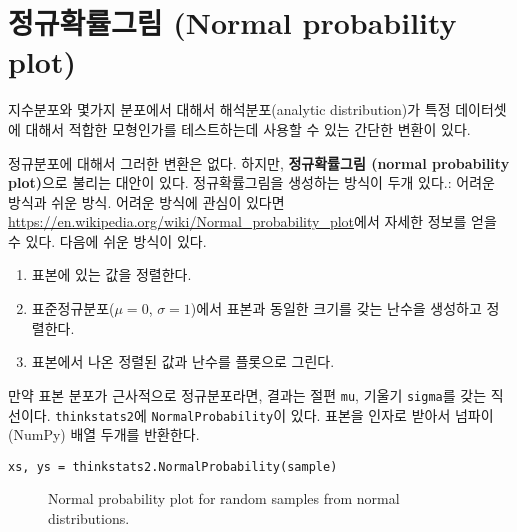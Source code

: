 \section{정규확률그림 (Normal probability plot)}

지수분포와 몇가지 분포에서 대해서 해석분포(analytic distribution)가 특정 데이터셋에 대해서
적합한 모형인가를 테스트하는데 사용할 수 있는 간단한 변환이 있다.


정규분포에 대해서 그러한 변환은 없다. 하지만, 
{\bf 정규확률그림 (normal probability plot)}으로 불리는 대안이 있다.
정규확률그림을 생성하는 방식이 두개 있다.: 어려운 방식과 쉬운 방식.
어려운 방식에 관심이 있다면 \url{https://en.wikipedia.org/wiki/Normal_probability_plot}에서 
자세한 정보를 얻을 수 있다.
다음에 쉬운 방식이 있다.

\begin{enumerate}

\item 표본에 있는 값을 정렬한다.

\item 표준정규분포($\mu=0$, $\sigma=1$)에서 표본과 동일한 크기를 갖는 난수을 생성하고
정렬한다.

\item 표본에서 나온 정렬된 값과 난수를 플롯으로 그린다.

\end{enumerate}

만약 표본 분포가 근사적으로 정규분포라면, 결과는 
절편 {\tt mu}, 기울기 {\tt sigma}를 갖는 직선이다.
{\tt thinkstats2}에 {\tt NormalProbability}이 있다.
표본을 인자로 받아서 넘파이(NumPy) 배열 두개를 반환한다.

\begin{verbatim}
xs, ys = thinkstats2.NormalProbability(sample)
\end{verbatim}

\begin{figure}
\caption{Normal probability plot for random samples from normal distributions.}
\label{analytic_normal_prob_example}
\end{figure}

